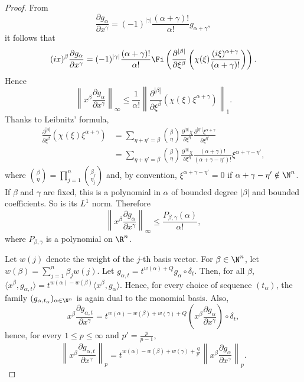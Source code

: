 \begin{proof}
From
\[
\frac{\partial g_{\alpha}}{\partial x^{\gamma}}=(-1)^{|\gamma|}\frac{(\alpha+\gamma)!}{\alpha!} g_{\alpha+\gamma},
\]
it follows that
\[
(ix)^\beta \frac{\partial g_{\alpha}}{\partial x^{\gamma}} = (-1)^{|\gamma|}\frac{(\alpha+\gamma)!}{\alpha!}\Fi \left(\frac{\partial^{|\beta|}}{\partial \xi^\beta} \left(\chi(\xi)\frac{(i\xi)^{\alpha+\gamma}}{(\alpha+\gamma)!}\right) \right).
\]
Hence
\[
\left\|x^\beta \frac{\partial g_{\alpha}}{\partial x^{\gamma}}
\right\|_{\infty}\leq \frac{1}{\alpha!} \left\|\frac{\partial^{|\beta|}}{\partial
\xi^\beta} (\chi(\xi)\xi^{\alpha+\gamma})\right\|_1.
\]
Thanks to Leibnitz' formula,
\begin{align*}
\frac{\partial^{|\beta|}}{\partial \xi^\beta} (\chi(\xi)
\xi^{\alpha+\gamma}) &=\sum_{\eta+\eta'=\beta}
\binom{\beta}{\eta}
\frac{\partial^{|\eta|}\chi}{\partial \xi^\eta}
\frac{\partial^{|\eta'|}\xi^{\alpha +\gamma}}{\partial \xi^{\eta'}}\\
&=\sum_{\eta+\eta'=\beta}
\binom{\beta}{\eta}
\frac{\partial^{|\eta|}\chi}{\partial \xi^\eta}
\frac{(\alpha+\gamma)!}{(\alpha+\gamma-\eta')!} \xi^{\alpha+\gamma-\eta'},
\end{align*}
where $\binom{\beta}{\eta}=\prod_{j=1}^n\binom{\beta_j}{\eta_j}$ and, by convention, $\xi^{\alpha+\gamma-\eta'}=0$ if $\alpha +\gamma -\eta'\notin\N^n$. If $\beta$ and $\gamma$ are fixed, this is a polynomial in $\alpha$ of bounded degree $|\beta|$ and bounded coefficients. So is its $L^1$ norm. Therefore
\[
\left\|x^\beta \frac{\partial g_{\alpha}}{\partial x^{\gamma}}\right\|_{\infty}\leq \frac{P_{\beta,\gamma}(\alpha)}{\alpha!},
\]
where $P_{\beta,\gamma}$ is a polynomial on $\R^n$.

Let $w(j)$ denote the weight of the $j$-th basis vector. For $\beta\in\N^n$, let $w(\beta)=\sum_{j=1}^n \beta_j w(j)$. Let $g_{\alpha,t}=t^{w(\alpha)+Q}g_\alpha\circ\delta_t$. Then, for all $\beta$, $\langle x^\beta,g_{\alpha,t}\rangle=t^{w(\alpha)-w(\beta)}\langle x^\beta,g_\alpha\rangle$. Hence, for every choice of sequence $(t_\alpha)$, the family $(g_{\alpha,t_\alpha})_{\alpha\in\N^n}$ is again dual to the monomial basis. Also,
\[
x^\beta \frac{\partial g_{\alpha,t}}{\partial x^{\gamma}} = t^{w(\alpha)-w(\beta)+w(\gamma)+Q} \left(x^\beta \frac{\partial g_{\alpha}}{\partial x^{\gamma}}\right) \circ \delta_t,
\]
hence, for every $1\leq p\leq \infty$ and $p'=\frac{p}{p-1}$,
\[
\left\|x^\beta \frac{\partial g_{\alpha,t}}{\partial x^{\gamma}}\right\|_{p} = t^{w(\alpha)-w(\beta)+w(\gamma)+\frac{Q}{p'}} \left\|x^\beta \frac{\partial g_{\alpha}}{\partial x^{\gamma}} \right\|_{p}.
\]


\end{proof}
